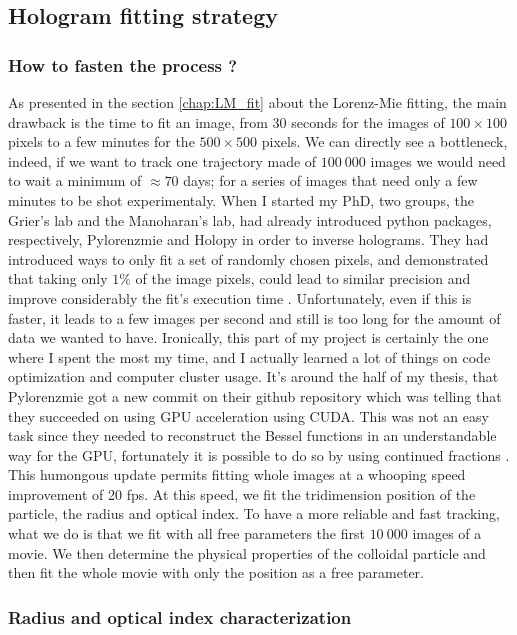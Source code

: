 \subsection{Hologram fitting strategy}

\subsubsection{How to fasten the process ?}

As presented in the section \ref{chap:LM_fit} about the Lorenz-Mie fitting, the main drawback is the time to fit an image, from $30$ seconds for the images of $100 \times  100$ pixels to a few minutes for the $500\times 500$ pixels. We can directly see a bottleneck, indeed, if we want to track one trajectory made of $100~000$ images we would need to wait a minimum of $\approx 70$ days; for a series of images that need only a few minutes to be shot experimentaly. When I started my PhD, two groups, the Grier's lab and the Manoharan's lab, had already introduced python packages, respectively, Pylorenzmie and Holopy in order to inverse holograms. They had introduced ways to only fit a set of randomly chosen pixels, and demonstrated that taking only $1\%$ of the image pixels, could lead to similar precision and improve considerably the fit's execution time \cite{dimiduk_random-subset_2014}. Unfortunately, even if this is faster, it leads to a few images per second and still is too long for the amount of data we wanted to have. Ironically, this part of my project is certainly the one where I spent the most my time, and I actually learned a lot of things on code optimization and computer cluster usage. It's around the half of my thesis, that Pylorenzmie got a new commit on their github repository which was telling that they succeeded on using GPU acceleration using CUDA. This was not an easy task since they needed to reconstruct the Bessel functions in an understandable way for the GPU, fortunately it is possible to do so by using continued fractions \cite{lentz_generating_1976}. This humongous update permits fitting whole images at a whooping speed improvement of 20 fps. At this speed, we fit the tridimension position of the particle, the radius and optical index. To have a more reliable and fast tracking, what we do is that we fit with all free parameters the first $10~000$ images of a movie. We then determine the physical properties of the colloidal particle and then fit the whole movie with only the position as a free parameter.

\subsubsection{Radius and optical index characterization}


